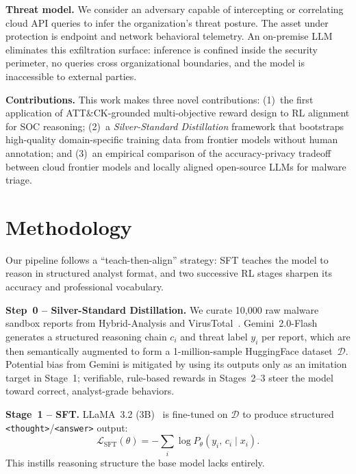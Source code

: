 \documentclass[conference,compsoc]{IEEEtran}
\begin{document}
\textbf{Threat model.}
We consider an adversary capable of intercepting or correlating cloud API
queries to infer the organization's threat posture.
The asset under protection is endpoint and network behavioral telemetry.
An on-premise LLM eliminates this exfiltration surface: inference is
confined inside the security perimeter, no queries cross organizational
boundaries, and the model is inaccessible to external parties.

\textbf{Contributions.}
This work makes three novel contributions:
(1)~the first application of ATT\&CK-grounded multi-objective reward design
to RL alignment for SOC reasoning;
(2)~a \emph{Silver-Standard Distillation} framework that bootstraps
high-quality domain-specific training data from frontier models without
human annotation;
and (3)~an empirical comparison of the accuracy-privacy tradeoff between
cloud frontier models and locally aligned open-source LLMs for malware
triage.

\section{Methodology}

Our pipeline follows a ``teach-then-align'' strategy: SFT teaches the model
to reason in structured analyst format, and two successive RL stages sharpen
its accuracy and professional vocabulary.

\textbf{Step~0 -- Silver-Standard Distillation.}
We curate 10,000 raw malware sandbox reports from Hybrid-Analysis
\cite{hybridanalysis} and VirusTotal~\cite{virustotal}.
Gemini~2.0-Flash~\cite{gemini} generates a structured reasoning chain
$c_i$ and threat label $y_i$ per report, which are then semantically
augmented to form a 1-million-sample HuggingFace dataset~$\mathcal{D}$.
Potential bias from Gemini is mitigated by using its outputs only as an
imitation target in Stage~1; verifiable, rule-based rewards in Stages~2--3
steer the model toward correct, analyst-grade behaviors.

\textbf{Stage~1 -- SFT.}
LLaMA~3.2 (3B)~\cite{llama3} is fine-tuned on $\mathcal{D}$
\cite{deepseekmath} to produce structured
\texttt{<thought>}/\texttt{<answer>} output:
\begin{equation}
  \mathcal{L}_\text{SFT}(\theta) = -\!\sum_i \log P_\theta(y_i,\,c_i \mid x_i).
\end{equation}
This instills reasoning structure the base model lacks entirely.
\end{document}
